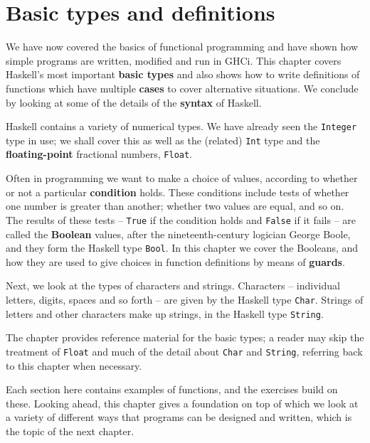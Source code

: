 %

\chapter{Basic types and definitions}
\chapstart
\label{BasicTypes}

We have now covered the basics of functional programming and have shown how
simple programs are written, modified and run in GHCi. This chapter
covers Haskell's most important \textbf{basic types} and also shows
how to write definitions of functions which have multiple
\textbf{cases} to cover alternative situations. We conclude by looking
at some of the details of  the \textbf{syntax} of Haskell.

Haskell contains a variety of numerical types. We have already seen the 
\texttt{Integer} type in use; we shall cover this as well as the (related) \texttt{Int} type and the \textbf{floating-point}
fractional numbers, \texttt{Float}.

Often in programming we want to make a choice of values, according to
whether or not a particular \textbf{condition} holds. These conditions
include tests of whether one number is greater than another; whether
two values are equal, and so on. The results of these tests -- \texttt{True} if the
condition holds and \texttt{False} if it fails -- are called the
\textbf{Boolean} values, after the nineteenth-century logician George
Boole, and they form the Haskell type
\texttt{Bool}. In this chapter we cover the Booleans, and how they are used
to give choices in function definitions by means of
\textbf{guards}.

Next, we look at the types of characters and strings. Characters -- 
individual letters, digits, spaces and so forth -- are 
given by the Haskell type \texttt{Char}. Strings of letters and other characters make up strings, in the Haskell type \texttt{String}.

The chapter provides
reference material for the basic types; a reader may
skip the treatment of \texttt{Float} and much of the detail about
\texttt{Char} and \texttt{String}, referring back to this chapter when necessary.

Each section here contains examples of functions, and the exercises build
on these.
Looking ahead, this chapter gives a foundation on top of which we look
at a variety of different ways that programs can be designed and
written, which
is the topic of the next chapter.

